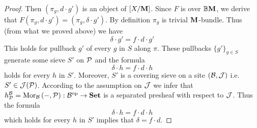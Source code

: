 \begin{proof}
Then $(\pi_g,d\cdot g')$ is an object of $[X/\mathbf{M}]$. Since $F$ is over $\mathbb{B}\mathbf{M}$, we derive that $F(\pi_g,d\cdot g') = (\pi_g,\delta \cdot g')$. By definition $\pi_g$ is trivial $\mathbf{M}$-bundle. Thus (from what we proved above) we have
$$\delta\cdot g' = f\cdot d\cdot g'$$
This holds for pullback $g'$ of every $g$ in $S$ along $\pi$. These pullbacks $\{g'\}_{g\in S}$ generate some sieve $S'$ on ${\mathcal P}$ and the formula
$$\delta\cdot h = f\cdot d\cdot h$$
holds for every $h$ in $S'$. Moreover, $S'$ is a covering sieve on a site $({\mathcal B},{\mathcal J})$ i.e. $S'\in {\mathcal J}({\mathcal P})$. According to the assumption on ${\mathcal J}$ we infer that $h^{{\mathcal B}}_{{\mathcal P}} = \mathrm{Mor}_{{\mathcal B}}\left(-,{\mathcal P}\right):{\mathcal B}^{\mathrm{op}}\rightarrow \mathbf{Set}$ is a separated presheaf with respect to ${\mathcal J}$. Thus the formula
$$\delta\cdot h = f\cdot d\cdot h$$
which holds for every $h$ in $S'$ implies that $\delta = f\cdot d$.
\end{proof}



































\small



